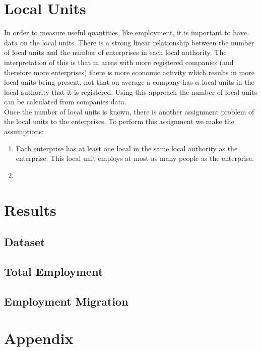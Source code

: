 \documentclass[a4paper,10pt]{article}
\begin{document}
\section{Local Units}
In order to measure useful quantities, like employment, it is important to have data on the local units. There is a strong linear relationship between the number of local units and the number of enterprises in each local authority. The interpretation of this is that in areas with more registered companies (and therefore more enterprises) there is more economic activity which results in more local units being present, not that on average a company has $\alpha$ local units in the local authority that it is registered. Using this approach the number of local units can be calculated from companies data.
\\ Once the number of local units is known, there is another assignment problem of the local units to the enterprises. To perform this assignment we make the assumptions:
\begin{enumerate}
 \item Each enterprise has at least one local in the same local authority as the enterprise. This local unit employs at most as many people as the enterprise.
 \item 
\end{enumerate}

\section{Results}
\subsection{Dataset}
\subsection{Total Employment}
\subsection{Employment Migration}

\section{Appendix}
\end{document}
